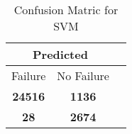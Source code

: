 \begin{table}[] 
\caption{Confusion Matric for SVM} 
\label{Table: Prediction Accuracy-NoneSVM95.0EKF-ignoreReflection-Reflection} 
\centering 
\begin{tabular} 
 {@{}ccc@{}} 
\toprule 
\multicolumn{2}{c}{\textbf{Predicted}}
 \\ \midrule 
\multicolumn{1}{|c|}{Failure} & 
\multicolumn{1}{c|}{No Failure}
 \\ \midrule 
\multicolumn{1}{|c|}{\color{green}\textbf{24516}} & 
\multicolumn{1}{c|}{\color{red}\textbf{1136}}
 \\ \midrule 
\multicolumn{1}{|c|}{\color{red}\textbf{28}} & 
\multicolumn{1}{c|}{\color{green}\textbf{2674}}
 \\ \bottomrule 
\end{tabular} 
\end{table} 
